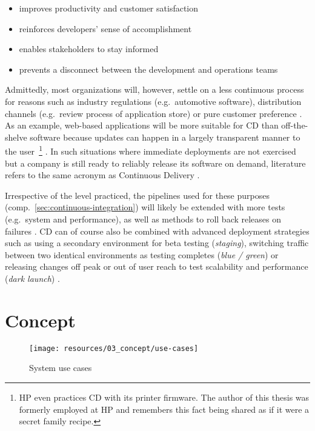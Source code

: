 \begin{appendices}
\begin{itemize}
  \item improves productivity and customer satisfaction
  \item reinforces developers' sense of accomplishment
  \item enables stakeholders to stay informed
  \item prevents a disconnect between the development and operations teams
\end{itemize}

Admittedly, most organizations will, however, settle on a less continuous process for reasons such as industry regulations (e.g.~automotive software), distribution channels (e.g.~review process of application store) or pure customer preference \cite[pp.~68--69]{leppanen2015highways}. As an example, web-based applications will be more suitable for \ac{CD} than off-the-shelve software because updates can happen in a largely transparent manner to the user~\footnote{\ac*{HP} even practices \ac{CD} with its printer firmware. The author of this thesis was formerly employed at \acs*{HP} and remembers this fact being shared as if it were a secret family recipe.} \cite[p.~22]{savor2016continuous}. In such situations where immediate deployments are not exercised but a company is still ready to reliably release its software on demand, literature refers to the same acronym as Continuous Delivery \cite[p.~50]{chen2015continuous}.

Irrespective of the level practiced, the pipelines used for these purposes (comp.~\autoref{sec:continuous-integration}) will likely be extended with more tests (e.g.~system and performance), as well as methods to roll back releases on failures \cite[pp.~52--53]{chen2015continuous}. \ac{CD} can of course also be combined with advanced deployment strategies such as using a secondary environment for beta testing (\textit{staging}), switching traffic between two identical environments as testing completes (\textit{blue / green}) or releasing changes off peak or out of user reach to test scalability and performance (\textit{dark launch}) \cite[p.~23]{savor2016continuous}.


\chapter{Concept}
\label{app:concept}

\begin{figure}[hbt]
  \centering
  \texttt{[image: resources/03\_concept/use-cases]}
  \caption{System use cases}
  \label{fig:system-use-cases}
\end{figure}


\end{appendices}
